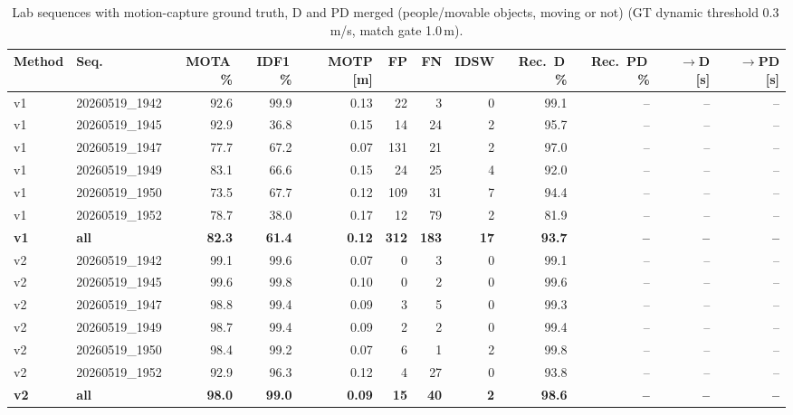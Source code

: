 \begin{table}[t]
\centering
\caption{Lab sequences with motion-capture ground truth, D and PD merged (people/movable objects, moving or not) (GT dynamic threshold 0.3\,m/s, match gate 1.0\,m).}
\label{tab:own_r9c_merged}
\setlength{\tabcolsep}{3pt}
\begin{tabular}{llrrrrrrrrrr}
\toprule
Method & Seq. & MOTA\,\% & IDF1\,\% & MOTP [m] & FP & FN & IDSW & Rec.\ D\,\% & Rec.\ PD\,\% & $\to$D [s] & $\to$PD [s] \\
\midrule
v1 & 20260519\_1942 & 92.6 & 99.9 & 0.13 & 22 & 3 & 0 & 99.1 & -- & -- & -- \\
v1 & 20260519\_1945 & 92.9 & 36.8 & 0.15 & 14 & 24 & 2 & 95.7 & -- & -- & -- \\
v1 & 20260519\_1947 & 77.7 & 67.2 & 0.07 & 131 & 21 & 2 & 97.0 & -- & -- & -- \\
v1 & 20260519\_1949 & 83.1 & 66.6 & 0.15 & 24 & 25 & 4 & 92.0 & -- & -- & -- \\
v1 & 20260519\_1950 & 73.5 & 67.7 & 0.12 & 109 & 31 & 7 & 94.4 & -- & -- & -- \\
v1 & 20260519\_1952 & 78.7 & 38.0 & 0.17 & 12 & 79 & 2 & 81.9 & -- & -- & -- \\
\textbf{v1} & \textbf{all} & \textbf{82.3} & \textbf{61.4} & \textbf{0.12} & \textbf{312} & \textbf{183} & \textbf{17} & \textbf{93.7} & \textbf{--} & \textbf{--} & \textbf{--} \\
\midrule
v2 & 20260519\_1942 & 99.1 & 99.6 & 0.07 & 0 & 3 & 0 & 99.1 & -- & -- & -- \\
v2 & 20260519\_1945 & 99.6 & 99.8 & 0.10 & 0 & 2 & 0 & 99.6 & -- & -- & -- \\
v2 & 20260519\_1947 & 98.8 & 99.4 & 0.09 & 3 & 5 & 0 & 99.3 & -- & -- & -- \\
v2 & 20260519\_1949 & 98.7 & 99.4 & 0.09 & 2 & 2 & 0 & 99.4 & -- & -- & -- \\
v2 & 20260519\_1950 & 98.4 & 99.2 & 0.07 & 6 & 1 & 2 & 99.8 & -- & -- & -- \\
v2 & 20260519\_1952 & 92.9 & 96.3 & 0.12 & 4 & 27 & 0 & 93.8 & -- & -- & -- \\
\textbf{v2} & \textbf{all} & \textbf{98.0} & \textbf{99.0} & \textbf{0.09} & \textbf{15} & \textbf{40} & \textbf{2} & \textbf{98.6} & \textbf{--} & \textbf{--} & \textbf{--} \\
\bottomrule
\end{tabular}
\end{table}
